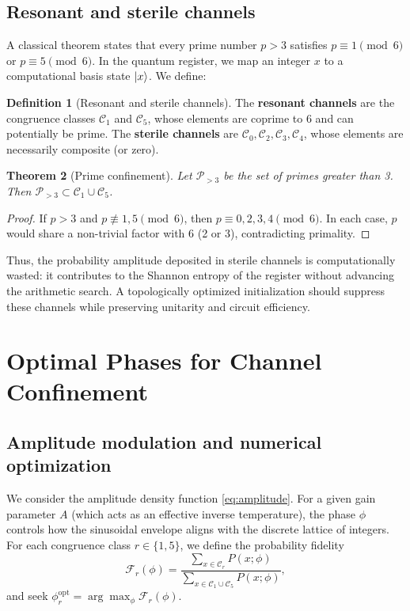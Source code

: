 \documentclass[12pt,a4paper]{article}
\theoremstyle{plain}
\newtheorem{theorem}{Theorem}[section]
\theoremstyle{definition}
\newtheorem{definition}[theorem]{Definition}
\theoremstyle{remark}
\begin{document}
\subsection{Resonant and sterile channels}
A classical theorem \cite{HardyWright} states that every prime number \(p > 3\) satisfies \(p \equiv 1 \pmod{6}\) or \(p \equiv 5 \pmod{6}\). In the quantum register, we map an integer \(x\) to a computational basis state \(\ket{x}\). We define:

\begin{definition}[Resonant and sterile channels]
The \textbf{resonant channels} are the congruence classes \(\mathcal{C}_1\) and \(\mathcal{C}_5\), whose elements are coprime to 6 and can potentially be prime. The \textbf{sterile channels} are \(\mathcal{C}_0, \mathcal{C}_2, \mathcal{C}_3, \mathcal{C}_4\), whose elements are necessarily composite (or zero).
\end{definition}

\begin{theorem}[Prime confinement]
\label{thm:prime_confinement}
Let \(\mathcal{P}_{>3}\) be the set of primes greater than 3. Then \(\mathcal{P}_{>3} \subset \mathcal{C}_1 \cup \mathcal{C}_5\).
\end{theorem}

\begin{proof}
If \(p > 3\) and \(p \not\equiv 1,5 \pmod{6}\), then \(p \equiv 0,2,3,4 \pmod{6}\). In each case, \(p\) would share a non-trivial factor with 6 (2 or 3), contradicting primality.
\end{proof}

Thus, the probability amplitude deposited in sterile channels is computationally wasted: it contributes to the Shannon entropy of the register without advancing the arithmetic search. A topologically optimized initialization should suppress these channels while preserving unitarity and circuit efficiency.

\section{Optimal Phases for Channel Confinement}
\label{sec:phases}

\subsection{Amplitude modulation and numerical optimization}
We consider the amplitude density function \eqref{eq:amplitude}. For a given gain parameter \(A\) (which acts as an effective inverse temperature), the phase \(\phi\) controls how the sinusoidal envelope aligns with the discrete lattice of integers. For each congruence class \(r \in \{1,5\}\), we define the probability fidelity
\begin{equation}
\mathcal{F}_r(\phi) = \frac{\sum_{x \in \mathcal{C}_r} P(x; \phi)}{\sum_{x \in \mathcal{C}_1 \cup \mathcal{C}_5} P(x; \phi)},
\label{eq:fidelity}
\end{equation}
and seek \(\phi_r^{\text{opt}} = \arg\max_\phi \mathcal{F}_r(\phi)\).
\end{document}
